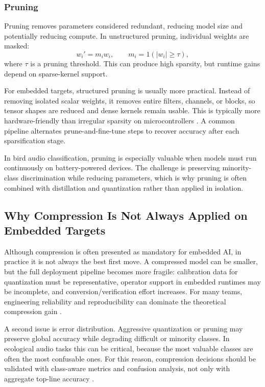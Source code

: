 \documentclass[a4paper,singleside,12pt]{report} %
\begin{document}
	\subsubsection{Pruning}
	Pruning removes parameters considered redundant, reducing model size and potentially reducing compute. In unstructured pruning, individual weights are masked:
	\begin{equation}
		w_i' = m_i w_i,\qquad
		m_i = 1\!\left(|w_i| \ge \tau\right),
	\end{equation}
	where \(\tau\) is a pruning threshold. This can produce high sparsity, but runtime gains depend on sparse-kernel support.

	For embedded targets, structured pruning is usually more practical. Instead of removing isolated scalar weights, it removes entire filters, channels, or blocks, so tensor shapes are reduced and dense kernels remain usable. This is typically more hardware-friendly than irregular sparsity on microcontrollers \cite{li2019pruning}. A common pipeline alternates prune-and-fine-tune steps to recover accuracy after each sparsification stage.

	In bird audio classification, pruning is especially valuable when models must run continuously on battery-powered devices. The challenge is preserving minority-class discrimination while reducing parameters, which is why pruning is often combined with distillation and quantization rather than applied in isolation.
	\subsection{Why Compression Is Not Always Applied on Embedded Targets}
	Although compression is often presented as mandatory for embedded AI, in practice it is not always the best first move. A compressed model can be smaller, but the full deployment pipeline becomes more fragile: calibration data for quantization must be representative, operator support in embedded runtimes may be incomplete, and conversion/verification effort increases. For many teams, engineering reliability and reproducibility can dominate the theoretical compression gain \cite{abadade2023tinymlsurvey,singh2023edgeaisurvey}.

	A second issue is error distribution. Aggressive quantization or pruning may preserve global accuracy while degrading difficult or minority classes. In ecological audio tasks this can be critical, because the most valuable classes are often the most confusable ones. For this reason, compression decisions should be validated with class-aware metrics and confusion analysis, not only with aggregate top-line accuracy \cite{tao2022energy,wuint8quant2020,li2019pruning}.
\end{document}
